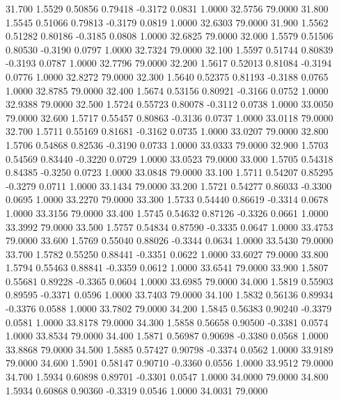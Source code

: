   31.700   1.5529   0.50856   0.79418  -0.3172   0.0831   1.0000  32.5756  79.0000
  31.800   1.5545   0.51066   0.79813  -0.3179   0.0819   1.0000  32.6303  79.0000
  31.900   1.5562   0.51282   0.80186  -0.3185   0.0808   1.0000  32.6825  79.0000
  32.000   1.5579   0.51506   0.80530  -0.3190   0.0797   1.0000  32.7324  79.0000
  32.100   1.5597   0.51744   0.80839  -0.3193   0.0787   1.0000  32.7796  79.0000
  32.200   1.5617   0.52013   0.81084  -0.3194   0.0776   1.0000  32.8272  79.0000
  32.300   1.5640   0.52375   0.81193  -0.3188   0.0765   1.0000  32.8785  79.0000
  32.400   1.5674   0.53156   0.80921  -0.3166   0.0752   1.0000  32.9388  79.0000
  32.500   1.5724   0.55723   0.80078  -0.3112   0.0738   1.0000  33.0050  79.0000
  32.600   1.5717   0.55457   0.80863  -0.3136   0.0737   1.0000  33.0118  79.0000
  32.700   1.5711   0.55169   0.81681  -0.3162   0.0735   1.0000  33.0207  79.0000
  32.800   1.5706   0.54868   0.82536  -0.3190   0.0733   1.0000  33.0333  79.0000
  32.900   1.5703   0.54569   0.83440  -0.3220   0.0729   1.0000  33.0523  79.0000
  33.000   1.5705   0.54318   0.84385  -0.3250   0.0723   1.0000  33.0848  79.0000
  33.100   1.5711   0.54207   0.85295  -0.3279   0.0711   1.0000  33.1434  79.0000
  33.200   1.5721   0.54277   0.86033  -0.3300   0.0695   1.0000  33.2270  79.0000
  33.300   1.5733   0.54440   0.86619  -0.3314   0.0678   1.0000  33.3156  79.0000
  33.400   1.5745   0.54632   0.87126  -0.3326   0.0661   1.0000  33.3992  79.0000
  33.500   1.5757   0.54834   0.87590  -0.3335   0.0647   1.0000  33.4753  79.0000
  33.600   1.5769   0.55040   0.88026  -0.3344   0.0634   1.0000  33.5430  79.0000
  33.700   1.5782   0.55250   0.88441  -0.3351   0.0622   1.0000  33.6027  79.0000
  33.800   1.5794   0.55463   0.88841  -0.3359   0.0612   1.0000  33.6541  79.0000
  33.900   1.5807   0.55681   0.89228  -0.3365   0.0604   1.0000  33.6985  79.0000
  34.000   1.5819   0.55903   0.89595  -0.3371   0.0596   1.0000  33.7403  79.0000
  34.100   1.5832   0.56136   0.89934  -0.3376   0.0588   1.0000  33.7802  79.0000
  34.200   1.5845   0.56383   0.90240  -0.3379   0.0581   1.0000  33.8178  79.0000
  34.300   1.5858   0.56658   0.90500  -0.3381   0.0574   1.0000  33.8534  79.0000
  34.400   1.5871   0.56987   0.90698  -0.3380   0.0568   1.0000  33.8868  79.0000
  34.500   1.5885   0.57427   0.90798  -0.3374   0.0562   1.0000  33.9189  79.0000
  34.600   1.5901   0.58147   0.90710  -0.3360   0.0556   1.0000  33.9512  79.0000
  34.700   1.5934   0.60898   0.89701  -0.3301   0.0547   1.0000  34.0000  79.0000
  34.800   1.5934   0.60868   0.90360  -0.3319   0.0546   1.0000  34.0031  79.0000
